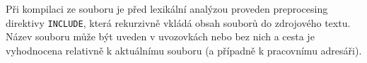 Při kompilaci ze souboru je před lexikální analýzou proveden preprocesing
direktivy \texttt{INCLUDE}, která rekurzivně vkládá obsah souborů do zdrojového
textu. Název souboru může být uveden v uvozovkách nebo bez nich a cesta je
vyhodnocena relativně k aktuálnímu souboru (a případně k pracovnímu adresáři).
